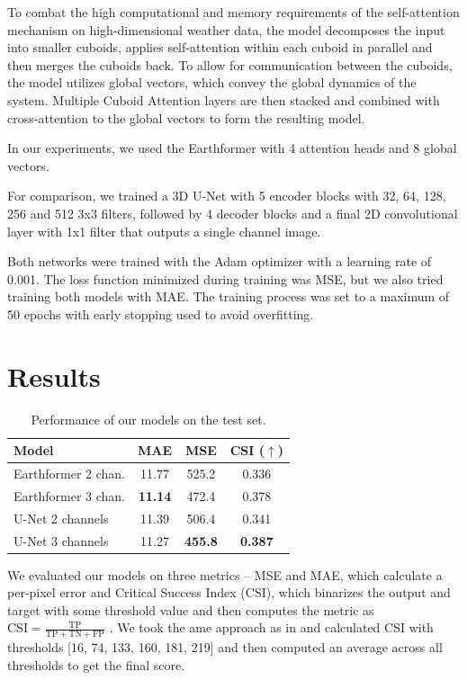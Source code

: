 \documentclass[english]{mvi-report}
\begin{document}
To combat the high computational and memory requirements of the self-attention mechanism on high-dimensional weather data, the model decomposes the input into smaller cuboids, applies self-attention within each cuboid in parallel and then merges the cuboids back. To allow for communication between the cuboids, the model utilizes global vectors, which convey the global dynamics of the system.
Multiple Cuboid Attention layers are then stacked and combined with cross-attention to the global vectors to form the resulting model. \cite{earthformer}

In our experiments, we used the Earthformer with 4 attention heads and 8 global vectors. 

For comparison, we trained a 3D U-Net with 5 encoder blocks with 32, 64, 128, 256 and 512 3x3 filters, followed by 4 decoder blocks and a final 2D convolutional layer with 1x1 filter that outputs a single channel image.

Both networks were trained with the Adam optimizer with a learning rate of 0.001. The loss function minimized during training was MSE, but we also tried training both models with MAE. The training process was set to a maximum of 50 epochs with early stopping used to avoid overfitting.

\section{Results}

\begin{table}
    \centering
    \begin{tabular}{l||ccc}
        Model & MAE & MSE & CSI ($\uparrow$) \\
        \hline\hline
        Earthformer 2 chan. & 11.77 & 525.2 & 0.336 \\
        Earthformer 3 chan. & \textbf{11.14} & 472.4 & 0.378 \\
        U-Net 2 channels & 11.39 & 506.4 & 0.341 \\
        U-Net 3 channels & 11.27 & \textbf{455.8} & \textbf{0.387} \\
    \end{tabular}
    \caption{Performance of our models on the test set.}
    \label{tab:performance_2vs3_channels}
\end{table}

We evaluated our models on three metrics -- MSE and MAE, which calculate a per-pixel error and Critical Success Index (CSI), which binarizes the output and target with some threshold value and then computes the metric as $\textrm{CSI} = \frac{\textrm{TP}}{\textrm{TP} + \textrm{TN} + \textrm{FP}}$ \cite{forecast_glossary}. We took the ame approach as in \cite{SEVIR} and calculated CSI with thresholds [16, 74, 133, 160, 181, 219] and then computed an average across all thresholds to get the final score.
\end{document}
